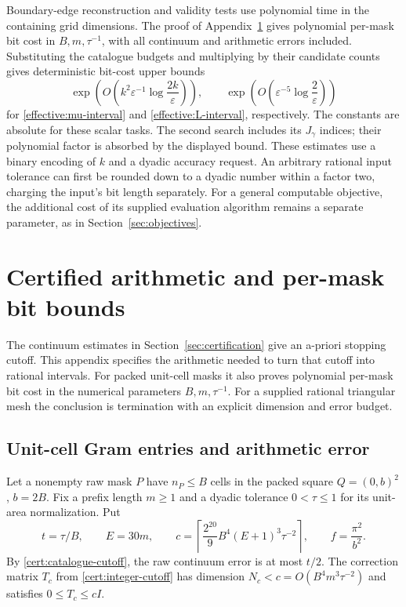 \documentclass[11pt,reqno]{amsart}
\numberwithin{equation}{section}
\begin{document}
Boundary-edge reconstruction and validity tests use polynomial
time in the containing grid dimensions.  The proof of
Appendix~\ref{arith:section} gives polynomial per-mask bit cost
in \(B,m,\tau^{-1}\), with all continuum and arithmetic errors
included.  Substituting the catalogue budgets and multiplying
by their candidate counts gives deterministic bit-cost upper bounds
\begin{equation}\label{effective:costs}
 \exp\!\left(O\!\left(k^2\varepsilon^{-1}
                         \log\frac{2k}{\varepsilon}\right)\right),
 \qquad
 \exp\!\left(O\!\left(\varepsilon^{-5}
                         \log\frac2\varepsilon\right)\right)
\end{equation}
for \eqref{effective:mu-interval} and
\eqref{effective:L-interval}, respectively.
The constants are absolute for these scalar tasks.
The second search includes its \(J_\gamma\) indices; their
polynomial factor is absorbed by the displayed bound.
These estimates use a binary encoding of \(k\) and a dyadic
accuracy request.  An arbitrary rational input tolerance can
first be rounded down to a dyadic number within a factor two,
charging the input's bit length separately.
For a general computable objective, the additional cost of its
supplied evaluation algorithm remains a separate parameter,
as in Section~\ref{sec:objectives}.



\appendix


\section{Certified arithmetic and per-mask bit bounds}
\label{arith:section}

The continuum estimates in Section~\ref{sec:certification} give
an a-priori stopping cutoff.  This appendix specifies the
arithmetic needed to turn that cutoff into rational intervals.
For packed unit-cell masks it also proves polynomial per-mask
bit cost in the numerical parameters $B,m,\tau^{-1}$.  For a
supplied rational triangular mesh the conclusion is termination
with an explicit dimension and error budget.

\subsection{Unit-cell Gram entries and arithmetic error}
\label{arith:one-mask}

Let a nonempty raw mask $P$ have $n_P\le B$ cells in the
packed square $Q=(0,b)^2$, $b=2B$.  Fix a prefix length $m\ge1$
and a dyadic tolerance $0<\tau\le1$ for its unit-area
normalization.  Put
\begin{equation}\label{arith:square-cutoff}
 t=\tau/B,\qquad E=30m,\qquad
 c=\left\lceil\frac{2^{20}}9 B^4(E+1)^3\tau^{-2}\right\rceil,
 \qquad f=\frac{\pi^2}{b^2}.
\end{equation}
By \eqref{cert:catalogue-cutoff}, the raw continuum error is
at most $t/2$.  The correction matrix $T_c$ from
\eqref{cert:integer-cutoff} has dimension
$N_c<c=O(B^4m^3\tau^{-2})$ and satisfies $0\le T_c\le cI$.
\end{document}
